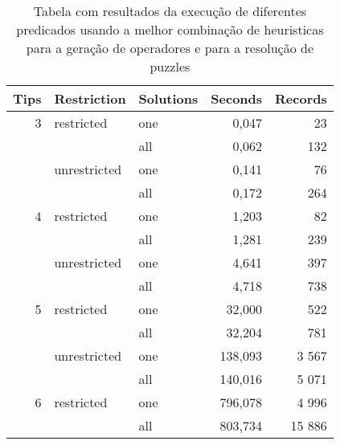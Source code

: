 \begin{table}[H]
  \centering
  \caption{Tabela com resultados da execução de diferentes predicados usando a melhor combinação de heuristicas para a geração de operadores e para a resolução de puzzles}
    \begin{tabular}{rrlrr}
    \hline
    \multicolumn{1}{l}{Tips} & \multicolumn{1}{l}{Restriction} & Solutions & \multicolumn{1}{l}{Seconds} & \multicolumn{1}{l}{Records} \\ \hline\hline
    3     & \multicolumn{1}{l}{restricted} & one   & 0,047 & 23 \\
          &       & all   & 0,062 & 132 \\
          & \multicolumn{1}{l}{unrestricted} & one   & 0,141 & 76 \\
          &       & all   & 0,172 & 264 \\
    4     & \multicolumn{1}{l}{restricted} & one   & 1,203 & 82 \\
          &       & all   & 1,281 & 239 \\
          & \multicolumn{1}{l}{unrestricted} & one   & 4,641 & 397 \\
          &       & all   & 4,718 & 738 \\
    5     & \multicolumn{1}{l}{restricted} & one   & 32,000 & 522 \\
          &       & all   & 32,204 & 781 \\
          & \multicolumn{1}{l}{unrestricted} & one   & 138,093 & 3 567 \\
          &       & all   & 140,016 & 5 071 \\
    6     & \multicolumn{1}{l}{restricted} & one   & 796,078 & 4 996 \\
          &       & all   & 803,734 & 15 886 \\ \hline
    \end{tabular}%
  \label{tab:best_heuristics}%
\end{table}%
